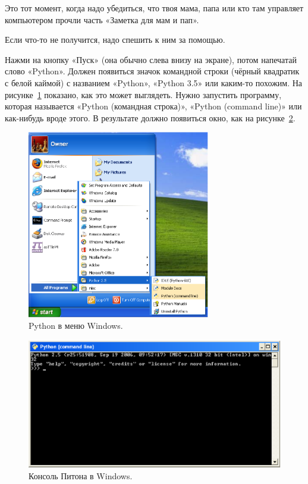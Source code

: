 Это тот момент, когда надо убедиться, что твоя мама, папа или кто там управляет компьютером прочли часть «Заметка для мам и пап».
\begin{WINDOWS}
Если что-то не получится, надо спешить к ним за помощью.

Нажми на кнопку «Пуск» (она обычно слева внизу на экране), потом напечатай слово «Python». Должен появиться значок командной строки (чёрный квадратик с белой каймой) с названием «Python», «Python 3.5» или каким-то похожим. На рисунке \ref{fig1} показано, как это может выглядеть. Нужно запустить программу, которая называется «Python (командная строка)», «Python (command line)» или как-нибудь вроде этого. В результате должно появиться окно, как на рисунке \ref{fig2}.

\begin{figure}
	\begin{center}
		\includegraphics[width=80mm]{../en/figure1.eps}
	\end{center}
	\caption{Python в меню Windows.}\label{fig1}
\end{figure}

\begin{figure}
	\begin{center}
		\includegraphics[width=135mm]{../en/figure2.eps}
	\end{center}
	\caption{Консоль Питона в Windows.}\label{fig2}
\end{figure}
\end{WINDOWS}
